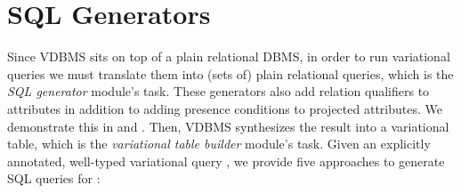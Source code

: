 \section{SQL Generators}
\label{sec:apps}


%
Since VDBMS sits on top of a plain relational DBMS, in order to run
variational queries we must translate them into (sets of) plain relational queries,
which is the \emph{SQL generator} module's task.
These generators also add relation qualifiers to attributes in addition to 
adding presence conditions to projected attributes. We demonstrate this
in  and .
Then, VDBMS synthesizes the result into a variational table, which is the
\emph{variational table builder} module's task.
%
Given an explicitly annotated, well-typed variational query \vQ,
we provide five 
approaches to generate SQL queries for \vQ:
